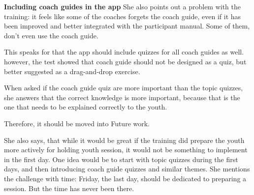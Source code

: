 \textbf{Including coach guides in the app}
She also points out a problem with the training: it feels like some of the coaches forgets the coach guide, even if it has been improved and better integrated with the participant manual. Some of them, don't even use the coach guide.

This speaks for that the app should include quizzes for all coach guides as well. however, the test showed that coach guide should not be designed as a quiz, but better suggested as a drag-and-drop exercise.

When asked if the coach guide quiz are more important than the topic quizzes, she answers that the correct knowledge is more important, because that is the one that needs to be explained correctly to the youth.

Therefore, it should be moved into Future work.

She also says, that while it would be great if the training did prepare the youth more actively for holding youth session, it would not be something to implement in the first day. One idea would be to start with topic quizzes during the first days, and then introducing coach guide quizzes and similar themes. She mentions the challenge with time: Friday, the last day, should be dedicated to preparing a session. But the time has never been there.

